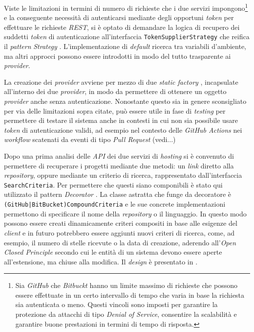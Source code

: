 Viste le limitazioni in termini di numero di richieste che i due servizi impongono\footnote{Sia \textit{GitHub} che \textit{Bitbuckt} hanno un limite massimo di richieste che possono essere effettuate in un certo intervallo di tempo che varia in base la richiesta sia autenticata o meno. Questi vincoli sono imposti per garantire la protezione da attacchi di tipo \textit{Denial of Service}, consentire la scalabilità e garantire buone prestazioni in termini di tempo di risposta.} e la conseguente necessità di autenticarsi mediante degli opportuni \textit{token} per effettuare le richieste \textit{REST}, si è optato di demandare la logica di recupero dei suddetti \textit{token} di autenticazione all'interfaccia \texttt{TokenSupplierStrategy} che reifica il \textit{pattern} \textit{Strategy} \cite{gof}.
%
L'implementazione di \textit{default} ricerca tra variabili d'ambiente, ma altri approcci possono essere introdotti in modo del tutto trasparente ai \textit{provider}.

La creazione dei \textit{provider} avviene per mezzo di due \textit{static factory} \cite{effective-java}, incapsulate all'interno dei due \textit{provider}, in modo da permettere di ottenere un oggetto \textit{provider} anche senza autenticazione.
%
Nonostante questo sia in genere sconsigliato per via delle limitazioni sopra citate, può essere utile in fase di \textit{testing} per permettere di testare il sistema anche in contesti in cui non sia possibile usare \textit{token} di autenticazione validi, ad esempio nel contesto delle \textit{GitHub Actions} nei \textit{workflow} scatenati da eventi di tipo \textit{Pull Request} (vedi...)

Dopo una prima analisi delle \textit{API} dei due servizi di \textit{hosting} si è convenuto di permettere di recuperare i progetti mediante due metodi: un \textit{link} diretto alla \textit{repository}, oppure mediante un criterio di ricerca, rappresentato dall'interfaccia \texttt{SearchCriteria}.
%
Per permettere che questi siano componibili è stato qui utilizzato il pattern \textit{Decorator} \cite{gof}.
%
La classe astratta che funge da decoratore è \texttt{(GitHub|BitBucket)CompoundCriteria} e le sue concrete implementazioni permettono di specificare il nome della \textit{repository} o il linguaggio.
%
In questo modo possono essere creati dinamicamente criteri compositi in base alle esigenze del \textit{client} e in futuro potrebbero essere aggiunti nuovi criteri di ricerca, come, ad esempio, il numero di stelle ricevute o la data di creazione, aderendo all'\textit{Open Closed Principle} secondo cui le entità di un sistema devono essere aperte all'estensione, ma chiuse alla modifica.
%
Il \textit{design} è presentato in .

